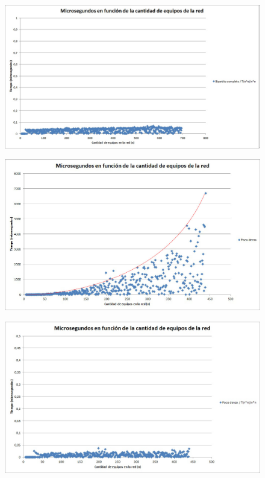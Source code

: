 \begin{figure}[H]
                \includegraphics[scale=0.6]{ej3/bPartComConst}
                \caption{}
                \label{fig:exp2}
\end{figure}                 

\begin{figure}[H]
                \includegraphics[scale=0.4]{ej3/pDenso}
                \caption{}
                \label{fig:exp2}
\end{figure} 



\begin{figure}[H]
                \includegraphics[scale=0.6]{ej3/pDensoConst}
                \caption{}
                \label{fig:exp2}
\end{figure}  

